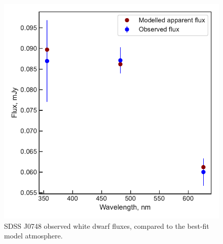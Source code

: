 \begin{figure}
    \centering
    \includegraphics[width=\textwidth]{figures/results/SDSS0748/fluxplot.pdf}
    \caption{SDSS J0748 observed white dwarf fluxes, compared to the best-fit model atmosphere.}
    \label{fig:SDSS0748 flux plot}
\end{figure}
\clearpage

